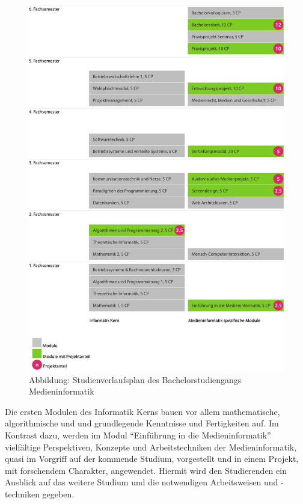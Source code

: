 \begin{figure}[htbp][htbp]
\centering
\includegraphics[width=\columnwidth]{../anhaenge/bilder/ba-verlaufsplan.pdf}
\caption{Abbildung: Studienverlaufsplan des Bachelorstudiengangs
Medieninformatik}
\end{figure}

Die ersten Modulen des Informatik Kerns bauen vor allem mathematische,
algorithmische und und grundlegende Kenntnisse und Fertigkeiten auf. Im
Kontrast dazu, werden im Modul ``Einführung in die Medieninformatik''
vielfältige Perspektiven, Konzepte und Arbeitstechniken der
Medieninformatik, quasi im Vorgriff auf der kommende Studium,
vorgestellt und in einem Projekt, mit forschendem Charakter, angewendet.
Hiermit wird den Studierenden ein Ausblick auf das weitere Studium und
die notwendigen Arbeitsweisen und -techniken gegeben.

